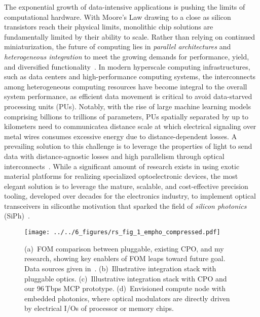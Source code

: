 The exponential growth of data-intensive applications is pushing the limits of computational hardware. With Moore's Law drawing to a close as silicon transistors reach their physical limits, monolithic chip solutions are fundamentally limited by their ability to scale. Rather than relying on continued miniaturization, the future of computing lies in \emph{parallel architectures} and \emph{heterogeneous integration} to meet the growing demands for performance, yield, and diversified functionality~\cite{iyerHeterogeneousIntegrationPerformance2016}. In modern hyperscale computing infrastructures, such as data centers and high-performance computing systems, the interconnects among heterogeneous computing resources have become integral to the overall system performance, as efficient data movement is critical to avoid data-starved processing units (PUs). Notably, with the rise of large machine learning models comprising billions to trillions of parameters, PUs spatially separated by up to kilometers need to communicate\textemdash{}a distance scale at which electrical signaling over metal wires consumes excessive energy due to distance-dependent losses. A prevailing solution to this challenge is to leverage the properties of light to send data with distance-agnostic losses and high parallelism through optical interconnects~\cite{millerRationaleChallengesOptical2000}. While a significant amount of research exists in using exotic material platforms for realizing specialized optoelectronic devices, the most elegant solution is to leverage the mature, scalable, and cost-effective precision tooling, developed over decades for the electronics industry, to implement optical transceivers in silicon\textemdash{}the motivation that sparked the field of \emph{silicon photonics} (SiPh)~\cite{sorefPresentFutureSilicon2006}.

\begin{wrapfigure}{r}{0.4\textwidth}
    \vspace{-1em}
    \begin{center}
        \texttt{[image: ../../6\_figures/rs\_fig\_1\_empho\_compressed.pdf]}
    \end{center}
    \caption{(a)~FOM comparison between pluggable, existing CPO, and my research, showing key enablers of FOM leaps toward future goal. Data sources given in~\cite{wangCoDesignedSiliconPhotonics2024}. (b)~Illustrative integration stack with pluggable optics. (c)~Illustrative integration stack with CPO and our 96\,Tbps MCP prototype. (d)~Envisioned compute node with embedded photonics, where optical modulators are directly driven by electrical I/Os of processor or memory chips.}
    \label{fig:embedded_photonics}
    \vspace{-3em}
\end{wrapfigure}

